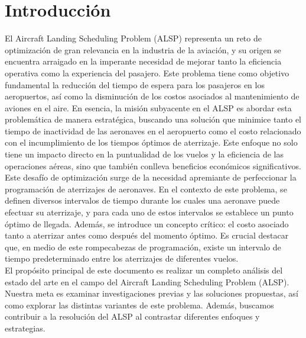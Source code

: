 \documentclass[letter, 10pt]{article}
\begin{document}
\section{Introducci\'on}
El Aircraft Landing Scheduling Problem (ALSP) representa un reto de optimizaci\'on de gran relevancia en la industria de la aviaci\'on, y su origen se encuentra arraigado en la imperante necesidad de mejorar tanto la eficiencia operativa como la experiencia del pasajero. Este problema tiene como objetivo fundamental la reducci\'on del tiempo de espera para los pasajeros en los aeropuertos, as\'i como la disminuci\'on de los costos asociados al mantenimiento de aviones en el aire. En esencia, la misi\'on subyacente en el ALSP es abordar esta problem\'atica de manera estrat\'egica, buscando una soluci\'on que minimice tanto el tiempo de inactividad de las aeronaves en el aeropuerto como el costo relacionado con el incumplimiento de los tiempos \'optimos de aterrizaje. Este enfoque no solo tiene un impacto directo en la puntualidad de los vuelos y la eficiencia de las operaciones a\'ereas, sino que tambi\'en conlleva beneficios econ\'omicos significativos. \\

Este desaf\'io de optimizaci\'on surge de la necesidad apremiante de perfeccionar la programaci\'on de aterrizajes de aeronaves. En el contexto de este problema, se definen diversos intervalos de tiempo durante los cuales una aeronave puede efectuar su aterrizaje, y para cada uno de estos intervalos se establece un punto \'optimo de llegada. Adem\'as, se introduce un concepto cr\'itico: el costo asociado tanto a aterrizar antes como despu\'es del momento \'optimo. Es crucial destacar que, en medio de este rompecabezas de programaci\'on, existe un intervalo de tiempo predeterminado entre los aterrizajes de diferentes vuelos. \\

El prop\'osito principal de este documento es realizar un completo an\'alisis del estado del arte en el campo del Aircraft Landing Scheduling Problem (ALSP). Nuestra meta es examinar investigaciones previas y las soluciones propuestas, as\'i como explorar las distintas variantes de este problema. Adem\'as, buscamos contribuir a la resoluci\'on del ALSP al contrastar diferentes enfoques y estrategias. \\
\end{document}
